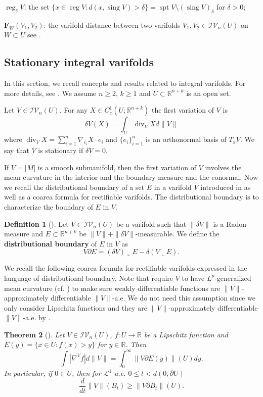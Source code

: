 \documentclass[11pt]{amsart}
\newtheorem{theorem}{Theorem}[section]
\theoremstyle{definition}
\newtheorem{definition}[theorem]{Definition}
\newcommand{\R}{\mathbb{R}}
\newcommand{\LL}{\mathcal{L}}
\newcommand{\IV}{\mathcal{IV}}
\DeclareMathOperator{\spt}{spt}
\DeclareMathOperator{\sing}{sing}
\DeclareMathOperator{\reg}{reg}
\DeclareMathOperator{\Div}{div}
\begin{document}
$\reg_\delta V$: the set $\{x\in \reg V:d(x,\sing V)> \delta\}=\spt V\setminus(\sing V)_\delta$ for $\delta>0$;

$\mathbf{F}_W(V_1,V_2)$: the varifold distance between two varifolds $V_1,V_2\in \IV_n(U)$ on $W\subset U$ see \cite[page 66]{pitts}.
\subsection{Stationary integral varifolds}
\label{Stationary.integral.varifolds}
In this section, we recall concepts and results related to integral varifolds. For more details, see \cite{allard1972first,Fed,Sim}. We assume $n\ge2$, $k\ge 1$ and $U\subset\R^{n+k}$ is an open set.

	Let $V\in \IV_n(U)$. For any $X\in C_c^1(U; \R^{n+k})$ the first variation of $V$ is \[\delta V(X)=\int_U \Div_{V}Xd\|V\|\]
	where $\Div_{V}X=\sum_{i=1}^{n} \nabla_{e_i}X\cdot e_i$ and $\{e_i\}_{i=1}^n$ is an orthonormal basis of $T_xV$. 
    We say that $V$ is stationary if  $\delta V=0$.

If $V=|M|$ is a smooth submanifold, then the first variation of $V$ involves the mean curvature in the interior and the boundary measure and the conormal. Now we recall the distributional boundary of a set $E$ in a varifold $V$ introduced in \cite{Me2weaklydifferentiable} as well as a coarea formula for rectifiable varifolds. The distributional boundary is to characterize the boundary of $E$ in $V$.
\begin{definition}[{\cite[Definition~5.1]{Me2weaklydifferentiable}}]\label{distributional.boundary}
    Let $V\in \IV_n(U)$ be a varifold such that $\|\delta V\|$ is a Radon measure and $E\subset \R^{n+k}$ be $\|V\|+\|\delta V\|$-measurable. We define the \textbf{distributional boundary} of $E$ in $V$ as
    \[V\partial E=(\delta V)\llcorner E-\delta (V\llcorner E).\]
\end{definition}
We recall the following coarea formula for rectifiable varifolds expressed in the language of distributional boundary. 
Note that \cite[Corollary~12.2]{Me2weaklydifferentiable} require $V$ to have $L^p$-generalized mean curvature (cf. \cite[Definition~16.5]{Sim}) to make sure weakly differentiable functions are $\|V\|$-approximately differentiable $\|V\|$-a.e. We do not need this assumption since we only consider Lipschitz functions and they are $\|V\|$-approximately differentiable $\|V\|$-a.e. by \cite[Lemma 4.5]{menne2012decay}.
\begin{theorem}[{\cite[Theorem 12.1, Corollary~12.2]{Me2weaklydifferentiable}}]\label{coarea}Let $V\in \IV_n(U)$, $f:U\to \R$ be a Lipschitz function and $E(y)=\{x\in U:f(x)>y\}$ for $y\in \R$. Then
    \[\int |\nabla^V f|d\|V\|=\int_0^\infty \|V\partial E(y)\|(U)dy.\]
    In particular, if $0\in U$, then for $\LL^1$-a.e. $0\le t<d(0,\partial U)$
    \[\frac{d}{dt} \|V\|(B_t)\ge \|V\partial B_t\|(U).\]
\end{theorem}
\end{document}
